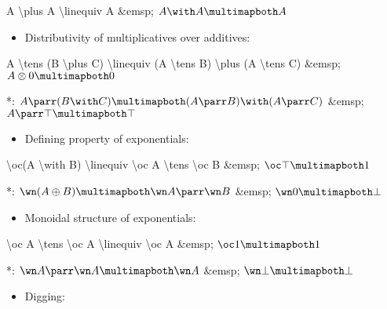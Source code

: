 A \textbackslash{}plus A \textbackslash{}linequiv A \&emsp;
\(A \with A \linequiv A\)

\begin{itemize}
\tightlist
\item
  Distributivity of multiplicatives over additives:

  \begin{description}
  \tightlist
  \item[]
  \end{description}
\end{itemize}

A \textbackslash{}tens (B \textbackslash{}plus C)
\textbackslash{}linequiv (A \textbackslash{}tens B) \textbackslash{}plus
(A \textbackslash{}tens C) \&emsp; \(A \tens \zero \linequiv \zero\)

*: \(A \parr (B \with C) \linequiv (A \parr B) \with (A \parr C)\)
\&emsp; \(A \parr \top \linequiv \top\)

\begin{itemize}
\tightlist
\item
  Defining property of exponentials:

  \begin{description}
  \tightlist
  \item[]
  \end{description}
\end{itemize}

\textbackslash{}oc(A \textbackslash{}with B) \textbackslash{}linequiv
\textbackslash{}oc A \textbackslash{}tens \textbackslash{}oc B \&emsp;
\(\oc\top \linequiv \one\)

*: \(\wn(A \plus B) \linequiv \wn A \parr \wn B\) \&emsp;
\(\wn\zero \linequiv \bot\)

\begin{itemize}
\tightlist
\item
  Monoidal structure of exponentials:

  \begin{description}
  \tightlist
  \item[]
  \end{description}
\end{itemize}

\textbackslash{}oc A \textbackslash{}tens \textbackslash{}oc A
\textbackslash{}linequiv \textbackslash{}oc A \&emsp;
\(\oc \one \linequiv \one\)

*: \(\wn A \parr \wn A \linequiv \wn A\) \&emsp;
\(\wn \bot \linequiv \bot\)

\begin{itemize}
\tightlist
\item
  Digging:

  \begin{description}
  \tightlist
  \item[]
  \end{description}
\end{itemize}

